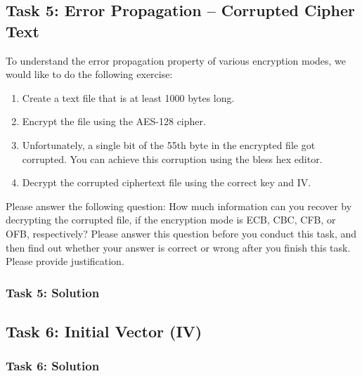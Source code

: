 \documentclass[12pt]{article}
\newcommand\tab[1][0.5cm]{\hspace*{#1}}
\begin{document}
\clearpage
\subsection{Task 5: Error Propagation – Corrupted Cipher Text}
To understand the error propagation property of various encryption modes, we would like to do the
following exercise:
\begin{enumerate}
    \item Create a text file that is at least 1000 bytes long.
    \item Encrypt the file using the AES-128 cipher.
    \item Unfortunately, a single bit of the 55th byte in the encrypted file got corrupted. You can
    achieve this corruption using the bless hex editor.
    \item Decrypt the corrupted ciphertext file using the correct key and IV.
\end{enumerate}
\tab Please answer the following question: How much information can you recover by decrypting the
corrupted file, if the encryption mode is ECB, CBC, CFB, or OFB, respectively? Please answer this
question before you conduct this task, and then find out whether your answer is correct or wrong after
you finish this task. Please provide justification.

\subsubsection{Task 5: Solution}

\subsection{Task 6: Initial Vector (IV)}
\subsubsection{Task 6: Solution}
\end{document}
